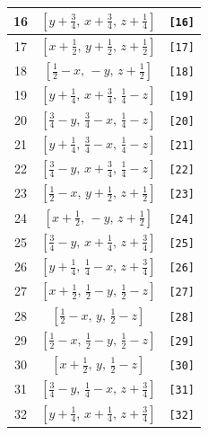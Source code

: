 \documentclass[fleqn,8pt]{jsarticle}
\begin{document}
\begin{longtable}{ccc}
16 & $\left[ y + \frac{3}{4},\, x + \frac{3}{4},\, z + \frac{1}{4} \right]$ & {\tt [16]} \\ \hline
17 & $\left[ x + \frac{1}{2},\, y + \frac{1}{2},\, z + \frac{1}{2} \right]$ & {\tt [17]} \\ \hline
18 & $\left[ \frac{1}{2} - x,\, - y,\, z + \frac{1}{2} \right]$ & {\tt [18]} \\ \hline
19 & $\left[ y + \frac{1}{4},\, x + \frac{3}{4},\, \frac{1}{4} - z \right]$ & {\tt [19]} \\ \hline
20 & $\left[ \frac{3}{4} - y,\, \frac{3}{4} - x,\, \frac{1}{4} - z \right]$ & {\tt [20]} \\ \hline
21 & $\left[ y + \frac{1}{4},\, \frac{3}{4} - x,\, \frac{1}{4} - z \right]$ & {\tt [21]} \\ \hline
22 & $\left[ \frac{3}{4} - y,\, x + \frac{3}{4},\, \frac{1}{4} - z \right]$ & {\tt [22]} \\ \hline
23 & $\left[ \frac{1}{2} - x,\, y + \frac{1}{2},\, z + \frac{1}{2} \right]$ & {\tt [23]} \\ \hline
24 & $\left[ x + \frac{1}{2},\, - y,\, z + \frac{1}{2} \right]$ & {\tt [24]} \\ \hline
25 & $\left[ \frac{3}{4} - y,\, x + \frac{1}{4},\, z + \frac{3}{4} \right]$ & {\tt [25]} \\ \hline
26 & $\left[ y + \frac{1}{4},\, \frac{1}{4} - x,\, z + \frac{3}{4} \right]$ & {\tt [26]} \\ \hline
27 & $\left[ x + \frac{1}{2},\, \frac{1}{2} - y,\, \frac{1}{2} - z \right]$ & {\tt [27]} \\ \hline
28 & $\left[ \frac{1}{2} - x,\, y,\, \frac{1}{2} - z \right]$ & {\tt [28]} \\ \hline
29 & $\left[ \frac{1}{2} - x,\, \frac{1}{2} - y,\, \frac{1}{2} - z \right]$ & {\tt [29]} \\ \hline
30 & $\left[ x + \frac{1}{2},\, y,\, \frac{1}{2} - z \right]$ & {\tt [30]} \\ \hline
31 & $\left[ \frac{3}{4} - y,\, \frac{1}{4} - x,\, z + \frac{3}{4} \right]$ & {\tt [31]} \\ \hline
32 & $\left[ y + \frac{1}{4},\, x + \frac{1}{4},\, z + \frac{3}{4} \right]$ & {\tt [32]} \\
\end{longtable}
\end{document}
